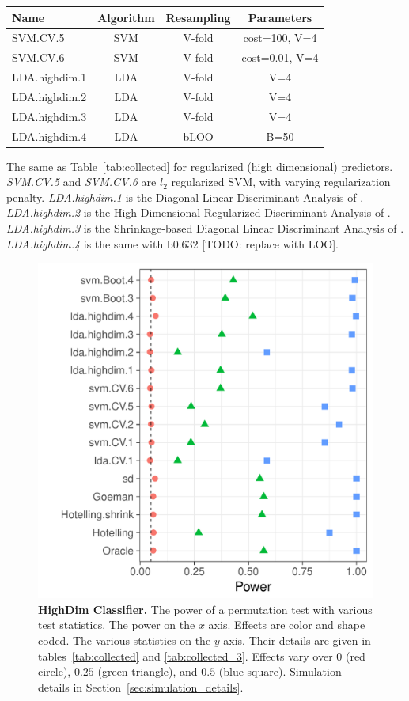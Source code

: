 \documentclass[12pt,a4paper]{article}
\begin{document}
\begin{tcolorbox}
	\centering
	\begin{tabular}{l|c|c|c}
		Name & Algorithm & Resampling &  Parameters\\ 
		\hline
		\hline
		SVM.CV.5 & SVM & V-fold & cost=100, V=4 \\ 
		SVM.CV.6 & SVM & V-fold & cost=0.01, V=4 \\ 
		LDA.highdim.1 & LDA & V-fold & V=4 \\ 
		LDA.highdim.2 & LDA & V-fold & V=4 \\ 
		LDA.highdim.3 & LDA & V-fold & V=4 \\ 
		LDA.highdim.4 & LDA & bLOO 	 & B=50 \\ 
	\end{tabular} 
	\captionsetup{type=table}
	\caption{
		The same as Table~\ref{tab:collected} for regularized (high dimensional) predictors. 
		\emph{SVM.CV.5} and \emph{SVM.CV.6} are $l_2$ regularized SVM, with varying regularization penalty.
		\emph{LDA.highdim.1} is the Diagonal Linear Discriminant Analysis of \cite{dudoit_comparison_2002}.
		\emph{LDA.highdim.2} is the High-Dimensional Regularized Discriminant Analysis of \cite{ramey_high-dimensional_2016}.
		\emph{LDA.highdim.3} is the Shrinkage-based Diagonal Linear Discriminant Analysis of \cite{pang_shrinkage-based_2009}.
		\emph{LDA.highdim.4} is the same with b$0.632$ [TODO: replace with LOO].
	} 
	\label{tab:collected_3}
\end{tcolorbox}


\begin{figure}[ht]
	\centering
	\includegraphics[width=0.5\linewidth]{"art/file14"}
	\caption{
		\textbf{HighDim Classifier.} 
		The power of a permutation test with various test statistics. 
		The power on the $x$ axis. 
		Effects are color and shape coded. 
		The various statistics on the $y$ axis. 
		Their details are given in tables~\ref{tab:collected} and \ref{tab:collected_3}. 
		Effects vary over $0$ (red circle), $0.25$ (green triangle), and $0.5$ (blue square). 
		Simulation details in Section~\ref{sec:simulation_details}.
	} 
	\label{fig:highdim}
\end{figure}
\end{document}
